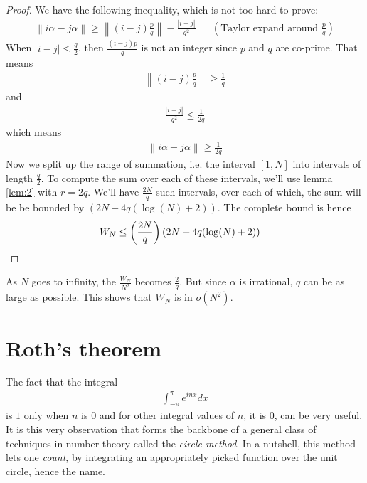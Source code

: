 \documentclass[12pt, titlepage]{article}
\theoremstyle{definition}
\newcommand{\norm}[1]{\left\lVert#1\right\rVert}
\begin{document}
\begin{proof}
    We have the following inequality, which is not too hard to prove:
    \begin{align*}
        \norm{i\alpha - j\alpha} \geq \norm{(i-j)\frac{p}{q}} - \frac{|i-j|}{q^2} &&\left(\text{Taylor expand around $\frac{p}{q}$}\right)
    \end{align*}
    When $|i-j| \leq \frac{q}{2}$, then $\frac{(i-j)p}{q}$ is not an integer since $p$ and $q$ are co-prime. That means
    \begin{align*}
        \norm{(i-j)\frac{p}{q}} \geq \frac{1}{q}
    \end{align*}
    and 
    \begin{align*}
        \frac{|i-j|}{q^2} \leq \frac{1}{2q}
    \end{align*}
    which means
    \begin{align*}
        \norm{i\alpha - j\alpha} \geq \frac{1}{2q}
    \end{align*}
    Now we split up the range of summation, i.e. the interval $[1, N]$ into intervals of length $\frac{q}{2}$. To compute the sum over each of these intervals, we'll use lemma \ref{lem:2} with $r = 2q$. We'll have $\frac{2N}{q}$ such intervals, over each of which, the sum will be be bounded by $\left( 2N +4q(\log(N) +2) \right)$. The complete bound is hence
    \begin{align*}
        W_N \leq \left( \frac{2N}{q}\right) \left( 2N +4q(\log(N) +2) \right) &\qedhere
    \end{align*}
\end{proof}
As $N$ goes to infinity, the $\frac{W_N}{N^2}$ becomes $\frac{2}{q}$. But since $\alpha$ is irrational, $q$ can be as large as possible. This shows that $W_N$ is in $o(N^2)$.

\newpage

\section{Roth's theorem}
The fact that the integral
\begin{align*}
    \int_{-\pi}^{\pi} e^{inx} dx
\end{align*}
is $1$ only when $n$ is $0$ and for other integral values of $n$, it is $0$, can be very useful. It is this very observation that forms the backbone of a general class of techniques in number theory called the \emph{circle method}. In a nutshell, this method lets one \emph{count}, by integrating an appropriately picked function over the unit circle, hence the name.
\end{document}
